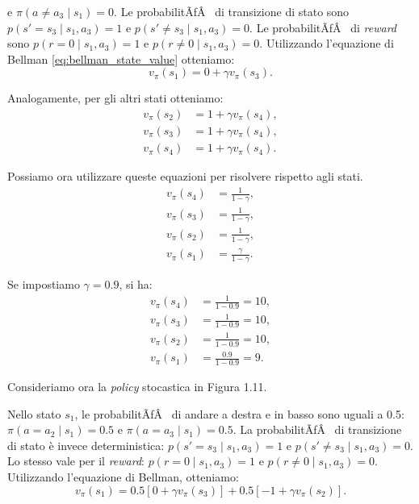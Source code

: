 ﻿\documentclass[11pt, a4paper]{report}
\begin{document}
e $\pi(a \ne a_3 \mid s_1) = 0$. Le probabilitÃƒÂ  di transizione di stato sono $p(s' = s_3 \mid s_1, a_3) = 1$ e $p(s' \ne s_3 \mid s_1, a_3) = 0$. Le probabilitÃƒÂ  di \emph{reward} sono $p(r = 0 \mid s_1, a_3) = 1$ e $p(r \ne 0 \mid s_1, a_3) = 0$. Utilizzando l'equazione di Bellman \eqref{eq:bellman_state_value} otteniamo:
\[ v_\pi(s_1) = 0 + \gamma v_\pi(s_3). \]

Analogamente, per gli altri stati otteniamo:
\begin{equation}
\begin{aligned}
v_\pi(s_2) &= 1 + \gamma v_\pi(s_4), \\
v_\pi(s_3) &= 1 + \gamma v_\pi(s_4), \\
v_\pi(s_4) &= 1 + \gamma v_\pi(s_4).
\end{aligned}
\end{equation}

Possiamo ora utilizzare queste equazioni per risolvere rispetto agli stati.
\begin{equation}
\begin{aligned}
v_\pi(s_4) &= \frac{1}{1 - \gamma}, \\
v_\pi(s_3) &= \frac{1}{1 - \gamma}, \\
v_\pi(s_2) &= \frac{1}{1 - \gamma}, \\
v_\pi(s_1) &= \frac{\gamma}{1 - \gamma}.
\end{aligned}
\end{equation}

Se impostiamo $\gamma = 0.9$, si ha:
\begin{equation}
\begin{aligned}
v_\pi(s_4) &= \frac{1}{1 - 0.9} = 10, \\
v_\pi(s_3) &= \frac{1}{1 - 0.9} = 10, \\
v_\pi(s_2) &= \frac{1}{1 - 0.9} = 10, \\
v_\pi(s_1) &= \frac{0.9}{1 - 0.9} = 9.
\end{aligned}
\end{equation}

Consideriamo ora la \emph{policy} stocastica in Figura 1.11.

Nello stato $s_1$, le probabilitÃƒÂ  di andare a destra e in basso sono uguali a 0.5: $\pi(a = a_2 \mid s_1) = 0.5$ e $\pi(a = a_3 \mid s_1) = 0.5$. La probabilitÃƒÂ  di transizione di stato è invece deterministica: $p(s' = s_3 \mid s_1, a_3) = 1$ e $p(s' \ne s_3 \mid s_1, a_3) = 0$. Lo stesso vale per il \emph{reward}: $p(r = 0 \mid s_1, a_3) = 1$ e $p(r \ne 0 \mid s_1, a_3) = 0$. Utilizzando l'equazione di Bellman, otteniamo:
\[ v_\pi(s_1) = 0.5 [0 + \gamma v_\pi(s_3)] + 0.5 [-1 + \gamma v_\pi(s_2)]. \]
\end{document}
